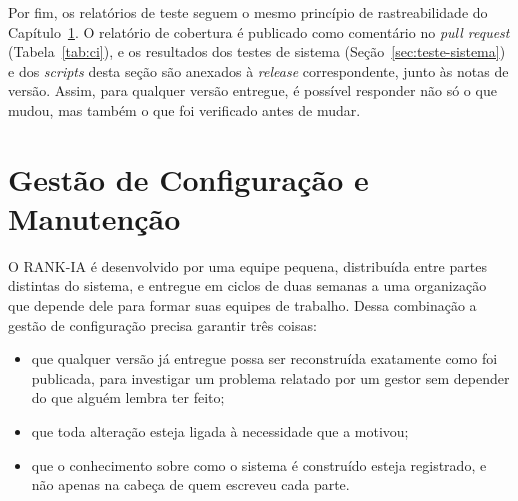 \documentclass[a4paper,12pt,oneside,openany]{book}
\newif\iforientacoes
\newcommand{\orientacao}[1]{%
    \iforientacoes
        \begin{quote}
        \small\itshape\textbf{Orientação:} #1
        \end{quote}
    \fi
}
\begin{document}
Por fim, os relatórios de teste seguem o mesmo princípio de rastreabilidade do
Capítulo~\ref{cha:configuracao}. O relatório de cobertura é publicado como
comentário no \textit{pull request} (Tabela~\ref{tab:ci}), e os resultados dos
testes de sistema (Seção~\ref{sec:teste-sistema}) e dos \textit{scripts} desta
seção são anexados à \textit{release} correspondente, junto às notas de versão.
Assim, para qualquer versão entregue, é possível responder não só o que mudou,
mas também o que foi verificado antes de mudar.

%
%
%

\chapter{Gestão de Configuração e Manutenção}\label{cha:configuracao}

\orientacao{Este capítulo deve mostrar como os artefatos do software são
versionados, modificados e mantidos de forma controlada. Relacionem as
práticas descritas ao projeto da equipe, evitando apenas reproduzir
definições teóricas.}

O RANK-IA é desenvolvido por uma equipe pequena, distribuída entre partes
distintas do sistema, e entregue em ciclos de duas semanas a uma organização
que depende dele para formar suas equipes de trabalho. Dessa combinação a
gestão de configuração precisa garantir três coisas:

\begin{itemize}[nosep]
    \item que qualquer versão já entregue possa ser reconstruída exatamente
    como foi publicada, para investigar um problema relatado por um gestor sem
    depender do que alguém lembra ter feito;
    \item que toda alteração esteja ligada à necessidade que a motivou;
    \item que o conhecimento sobre como o sistema é construído esteja
    registrado, e não apenas na cabeça de quem escreveu cada parte.
\end{itemize}
\end{document}

